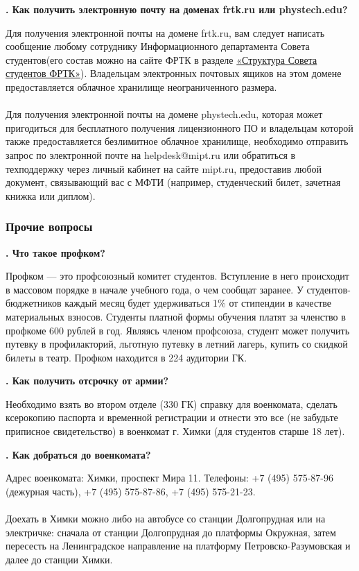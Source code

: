 \documentclass[14pt]{extarticle}
\newcounter{question}
\newcommand\Que[1]{%
    \begin{minipage}{\textwidth}
    \leavevmode\par
    \stepcounter{question}
    \noindent
    {\large\textbf{\thequestion. #1}}\par}
\newcommand\Ans[2][]{%
    \leavevmode\par\noindent
    {\leftskip37pt
    \textbf{#1}#2\par}
    \end{minipage}}
\begin{document}
\Que{Как получить электронную почту на доменах frtk.ru или phystech.edu?}
\Ans{Для получения электронной почты на домене frtk.ru, вам следует написать сообщение любому сотруднику Информационного департамента Совета студентов(его состав можно на сайте ФРТК в разделе \href{https://mipt.ru/drec/forstudents/studsovet/structure.php}{«Структура Совета студентов ФРТК»}). Владельцам электронных почтовых ящиков на этом домене предоставляется облачное хранилище неограниченного размера. \\ \\ Для получения электронной почты на домене phystech.edu, которая может пригодиться для бесплатного получения лицензионного ПО и владельцам которой также предоставляется безлимитное облачное хранилище, необходимо отправить запрос по электронной почте на helpdesk@mipt.ru или обратиться в техподдержку через личный кабинет на сайте mipt.ru, предоставив любой документ, связывающий вас с МФТИ (например, студенческий билет, зачетная книжка или диплом).}

\subsubsection{Прочие вопросы}

\Que{Что такое профком?}
\Ans{Профком — это профсоюзный комитет студентов. Вступление в него происходит в массовом порядке в начале учебного года, о чем сообщат заранее. У студентов-бюджетников каждый месяц будет удерживаться 1\% от стипендии в качестве материальных взносов. Студенты платной формы обучения платят за членство в профкоме 600 рублей в год. Являясь членом профсоюза, студент может получить путевку в профилакторий, льготную путевку в летний лагерь, купить со скидкой билеты в театр. Профком находится в 224 аудитории ГК.}

\Que{Как получить отсрочку от армии?}
\Ans{Необходимо взять во втором отделе (330 ГК) справку для военкомата, сделать ксерокопию паспорта и временной регистрации и отнести это все (не забудьте приписное свидетельство) в военкомат г. Химки (для студентов старше 18 лет).}

\Que{Как добраться до военкомата?}
\Ans{Адрес военкомата: Химки, проспект Мира 11. Телефоны: +7 (495) 575-87-96 (дежурная часть), +7 (495) 575-87-86, +7 (495) 575-21-23. \\ \\ Доехать в Химки можно либо на автобусе со станции Долгопрудная или на электричке: сначала от станции Долгопрудная до платформы Окружная, затем пересесть на Ленинградское направление на платформу Петровско-Разумовская и далее до станции Химки.}
\end{document}
